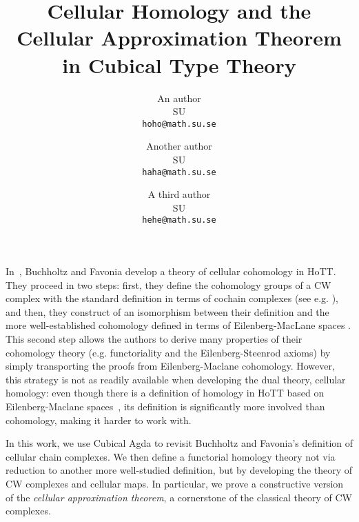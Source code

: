 \documentclass[a4page]{article}
\title{Cellular Homology and the Cellular Approximation Theorem in Cubical Type Theory}
\author{
  An author\\
  \footnotesize{SU}\\
  \footnotesize{\texttt{hoho@math.su.se}}
  \and
  Another author\\
  \footnotesize{SU}\\
  \footnotesize{\texttt{haha@math.su.se}}
  \and
  A third author\\
  \footnotesize{SU}\\
  \footnotesize{\texttt{hehe@math.su.se}}
}
\date{}
\begin{document}
\maketitle

In~\cite{BuchholtzFavonia18}, Buchholtz and Favonia develop a theory
of cellular cohomology in HoTT. They proceed in two steps:
%
first, they define the cohomology groups of a CW complex with the
standard definition in terms of cochain complexes (see e.g. \cite{May1999}),
and then, they construct of an isomorphism between their definition and
the more well-established cohomology defined in terms of Eilenberg-MacLane
spaces \cite{LicataFinster14}.
%
This second step allows the authors to derive many properties of their
cohomology theory (e.g. functoriality and the Eilenberg-Steenrod axioms)
by simply transporting the proofs from Eilenberg-Maclane cohomology.
%
However, this strategy is not as readily available when developing the dual
theory, cellular homology:
%
even though there is a definition of homology in HoTT based on
Eilenberg-Maclane spaces~\cite{graham18,christensen2020hurewicz}, its
definition is significantly more involved than cohomology, making
it harder to work with.
%

In this work, we use Cubical Agda to revisit Buchholtz and Favonia's
definition of cellular chain complexes.
%
We then define a functorial homology theory not via reduction to another more
well-studied definition, but by developing the theory of CW complexes and
cellular maps.
%
In particular, we prove a constructive version of the \emph{cellular
approximation theorem}, a cornerstone of the classical theory of CW complexes.

\bigskip
\end{document}
